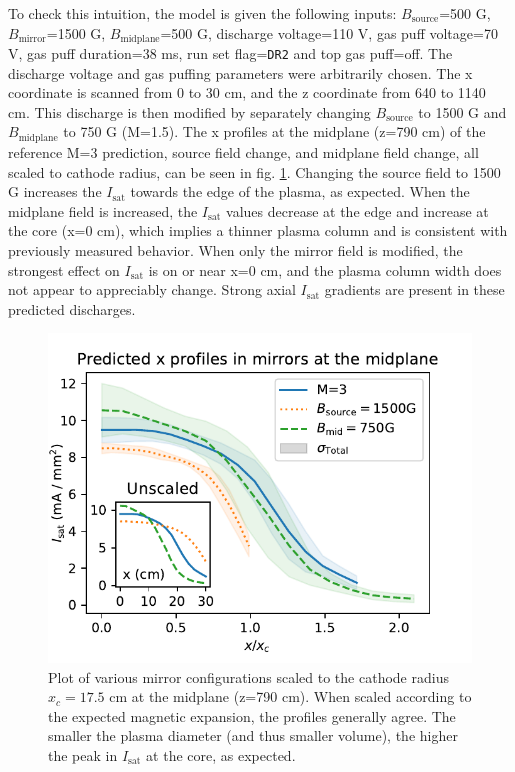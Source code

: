 To check this intuition, the model is given the following inputs: $B_\text{source}$=500 G, $B_\text{mirror}$=1500 G, $B_\text{midplane}$=500 G, discharge voltage=110 V, gas puff voltage=70 V, gas puff duration=38 ms, run set flag=\texttt{DR2} and top gas puff=off. The discharge voltage and gas puffing parameters were arbitrarily chosen. The x coordinate is scanned from 0 to 30 cm, and the z coordinate from 640 to 1140 cm. This discharge is then modified by separately changing $B_\text{source}$ to 1500 G and $B_\text{midplane}$ to 750 G (M=1.5). %
The x profiles at the midplane (z=790 cm) of the reference M=3 prediction, source field change, and midplane field change, all scaled to cathode radius, can be seen in fig. \ref{fig:changing-B-field_M=3_x-prof}. Changing the source field to 1500 G increases the $I_\text{sat}$ towards the edge of the plasma, as expected. When the midplane field is increased, the $I_\text{sat}$ values decrease at the edge and increase at the core (x=0 cm), which implies a thinner plasma column and is consistent with previously measured behavior. When only the mirror field is modified, the strongest effect on $I_\text{sat}$ is on or near x=0 cm, and the plasma column width does not appear to appreciably change. Strong axial $I_\text{sat}$ gradients are present in these predicted discharges.

\begin{figure}
	\centering
	\includegraphics[width=\textwidth]{figures/changing-B-field_M=3_x-prof.pdf}
	\caption[size=12]{\label{fig:changing-B-field_M=3_x-prof}Plot of various mirror configurations scaled to the cathode radius $x_c=17.5$ cm at the midplane (z=790 cm). When scaled according to the expected magnetic expansion, the profiles generally agree. The smaller the plasma diameter (and thus smaller volume), the higher the peak in $I_\text{sat}$ at the core, as expected. }
\end{figure}


